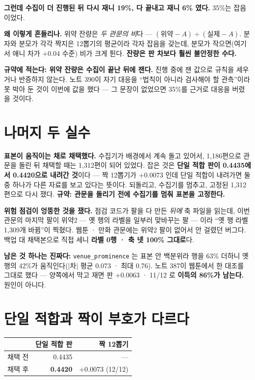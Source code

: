 \documentclass[11pt]{article}
\begin{document}
\textbf{그런데 수집이 더 진행된 뒤 다시 재니 19\%, 다 끝내고 재니 6\%
였다.} 35\%는 잡음이었다.

\textbf{왜 이렇게 흔들리나.} 위약 잔량은 \emph{두 관문의 비}다 ---
$(\text{위약} - A) \div (\text{실제} - A)$. 분자와 분모가 각각 짝지은
12뽑기의 평균이라 각자 잡음을 갖는데, 분모가 작으면(여기서 애니 차가
$+0.04$ 수준) 비가 크게 튄다. \textbf{잔량은 판 차보다 훨씬 불안정한
수다.}

\textbf{규약에 적는다: 위약 잔량은 수집이 끝난 뒤에 잰다.} 진행 중에 잰
값으로 규칙을 세우거나 반증하지 않는다. 노트 390이 자기 대응을
``법칙이 아니라 검사해야 할 관측''이라 못 박아 둔 것이 이번에 값을 했다
--- 그 문장이 없었으면 35\%를 근거로 대응을 버렸을 것이다.

\section{나머지 두 실수}

\textbf{표본이 움직이는 채로 채택했다.} 수집기가 배경에서 계속 돌고
있어서, 1,186편으로 관문을 돌린 뒤 채택할 때는 1,312편이 되어 있었다.
잡은 것은 \textbf{단일 적합 판이 0.4435에서 0.4420으로 내려간 것}이다 ---
짝 12뽑기가 $+0.0073$ 인데 단일 적합이 내려가면 둘 중 하나가 다른 자료를
보고 있다는 뜻이다. 되돌리고, 수집기를 멈추고, 고정된 1,312편으로 다시
쟀다. \textbf{규약: 관문을 돌리기 전에 수집기를 멈춰 표본을 고정한다.}

\textbf{위험 점검이 엉뚱한 것을 쟀다.} 점검 코드가 팔을 다 만든 \emph{뒤에}
축 파일을 읽는데, 이번 관문의 마지막 팔이 위약2 --- 옛 행의 라벨을 일부러
맞바꾸는 팔 --- 이라 ``옛 행 라벨 1,309개 바뀜''이 찍혔다. 웹툰 · 만화
관문에는 위약2 팔이 없어서 안 걸렸던 버그다. 백업 대 채택본으로 직접
세니 \textbf{라벨 0행 · 축 넷 100\% 그대로}다.

\textbf{남은 것 하나는 진짜다:} \texttt{venue\_prominence} 는 표본 안
백분위라 행을 63\% 더하니 옛 행의 42\%가 움직인다($|$차$|$ 평균 0.073 ·
최대 0.76). 노트 387이 웹툰에서 한 대조를 그대로 했다 --- 양쪽에서 막고
재면 판 $+0.0063$ · 11/12 로 \textbf{이득의 86\%가 남는다.} 원인이 아니다.

\section{단일 적합과 짝이 부호가 다르다}

\begin{center}
\begin{tabular}{lrr}
\hline
 & 단일 적합 판 & 짝 12뽑기 \\
\hline
채택 전 & 0.4435 & --- \\
채택 후 & \textbf{0.4420} & $\mathbf{+0.0073}$ (12/12) \\
\hline
\end{tabular}
\end{center}
\end{document}
